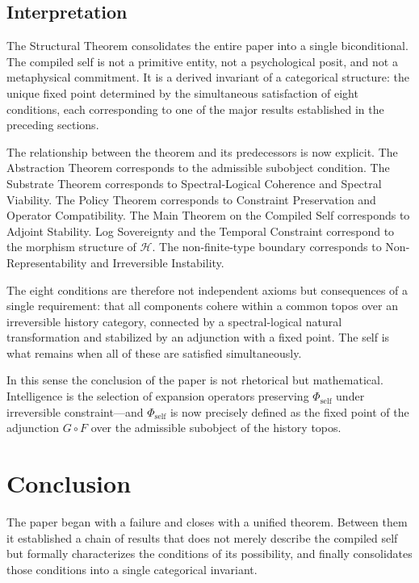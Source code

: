 \documentclass[12pt, a4paper]{article}
\theoremstyle{plain}
\theoremstyle{definition}
\theoremstyle{remark}
\begin{document}
\subsection{Interpretation}

The Structural Theorem consolidates the entire paper into a single biconditional. The compiled self is not a primitive entity, not a psychological posit, and not a metaphysical commitment. It is a derived invariant of a categorical structure: the unique fixed point determined by the simultaneous satisfaction of eight conditions, each corresponding to one of the major results established in the preceding sections.

The relationship between the theorem and its predecessors is now explicit. The Abstraction Theorem corresponds to the admissible subobject condition. The Substrate Theorem corresponds to Spectral-Logical Coherence and Spectral Viability. The Policy Theorem corresponds to Constraint Preservation and Operator Compatibility. The Main Theorem on the Compiled Self corresponds to Adjoint Stability. Log Sovereignty and the Temporal Constraint correspond to the morphism structure of $\mathcal{H}$. The non-finite-type boundary corresponds to Non-Representability and Irreversible Instability.

The eight conditions are therefore not independent axioms but consequences of a single requirement: that all components cohere within a common topos over an irreversible history category, connected by a spectral-logical natural transformation and stabilized by an adjunction with a fixed point. The self is what remains when all of these are satisfied simultaneously.

In this sense the conclusion of the paper is not rhetorical but mathematical. Intelligence is the selection of expansion operators preserving $\Phi_{\mathrm{self}}$ under irreversible constraint---and $\Phi_{\mathrm{self}}$ is now precisely defined as the fixed point of the adjunction $G \circ F$ over the admissible subobject of the history topos.

\section*{Conclusion}

The paper began with a failure and closes with a unified theorem. Between them it established a chain of results that does not merely describe the compiled self but formally characterizes the conditions of its possibility, and finally consolidates those conditions into a single categorical invariant.
\end{document}

